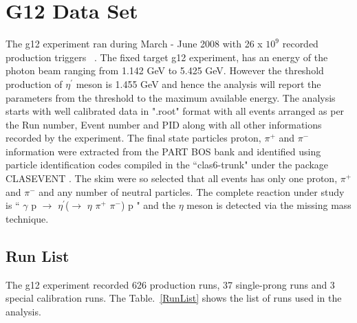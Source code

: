 \section {G12 Data Set}

The g12 experiment ran during March - June 2008 with 26 x $10^{9}$ recorded production triggers ~\cite{G12_AN}.  The fixed target g12 experiment, has an energy of the photon beam ranging from 1.142 GeV to  5.425 GeV. However the threshold production of $\eta^{\prime}$ meson is 1.455 GeV and hence the analysis will report the parameters from the threshold to the maximum available energy. The analysis starts with well calibrated data in ".root" format with all events arranged as per the Run number, Event number and PID along with all other informations recorded by the experiment. The final state particles proton, $\pi^{+}$ and $\pi^{-}$ information were extracted from the PART BOS bank and identified using particle identification codes compiled in the ``clas6-trunk" under the package CLASEVENT . The skim were so selected that all events has only one proton, $\pi^{+}$ and $\pi^{-}$ and any number of neutral particles. 
The complete reaction under study is `` $\gamma$ p $\rightarrow$ $\eta^{\prime}$($\rightarrow$ $\eta$ $\pi^{+}$ $\pi^{-}$) p " and the $\eta$ meson is detected via the missing mass technique. 

\subsection{Run List}
The g12 experiment recorded 626 production runs, 37 single-prong runs and 3 special calibration runs. The Table.~\ref{RunList} shows the list of runs used in the analysis.

